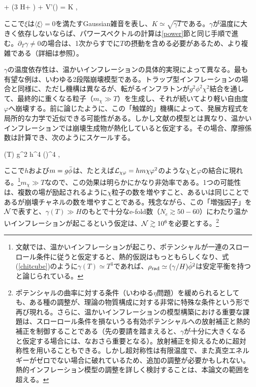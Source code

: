 \beq
\label{warmd1}
\ddot \phi + (3 H+ \gamma) \dot\phi + V'(\phi) = K \xi,
\eeq

ここで$\xi$は$\langle\xi\rangle=0$を満たすGaussian雑音を表し、$K\simeq\sqrt{\gamma T}$である。$\gamma$が温度に大きく依存しないならば、パワースペクトルの計算は\ref{power}節と同じ手順で進む。$\partial_T\gamma\neq0$の場合は、1次からすでに$T$の摂動を含める必要があるため、より複雑である（詳細は\cite{warmf33,berera11}参照）。

$\gamma$の温度依存性は、温かいインフレーションの具体的実現によって異なる。最も有望な例は、いわゆる2段階崩壊模型である\cite{warm}。トラップ型インフレーションの場合と同様に、ただし機構は異なるが、転がるインフラトンが$g^2\phi^2\chi^2$結合を通して、最終的に重くなる粒子（$m_\chi\gg T$）を生成し、それが続いてより軽い自由度$\varphi$へ崩壊する。前に論じたように、この「触媒的」機構によって、発展方程式を局所的な力学で近似できる可能性がある。しかし文献\cite{trapped}の模型とは異なり、温かいインフレーションでは崩壊生成物が熱化していると仮定する。その場合、摩擦係数は計算でき、次のようにスケールする\cite{warm}。

\beq
\label{chitcube}
\gamma(T) \simeq g^2 h^4 \left(\right)^4 ,
\eeq

ここで$h$および$m=g{\bar\phi}$は、たとえば${\cal L}_{\chi\varphi}=hm\chi\varphi^2$のような$\chi$と$\varphi$の結合に現れる。\footnote{文献\cite{reheating}では、温かいインフレーションが起こり、ポテンシャルが一連のスローロール条件\cite{warm}に従うと仮定すると、熱的仮説はもっともらしくなり、式(\ref{chitcube})のように$\gamma(T)\simeq T^3$であれば、$\rho_{\rm rad}\simeq(\gamma/H)\dot\phi^2$は安定平衡を持つと論じられている。}$m_\chi\gg T$なので、この効果は明らかにかなり非効率である。1つの可能性は、複数の場が励起されるように$\chi$粒子の数を増やすこと、あるいは同じことであるが崩壊チャネルの数を増やすことである。残念ながら、この「増強因子」を$\cal N$で表すと、$\gamma(T)\gg H$のもとで十分なe-fold数（$N_e\gtrsim50-60$）にわたり温かいインフレーションが起こるという仮定は、${\cal N}\gtrsim10^6$を必要とする\cite{bastero,bueno}。\footnote{ポテンシャルの曲率に対する条件（いわゆる$\eta$問題）を緩められるとしても、ある種の調整が、理論の物質構成に対する非常に特殊な条件という形で再び現れる。さらに、温かいインフレーションの模型構築における重要な課題は、スローロール条件を損ないうる有効ポテンシャルへの放射補正と熱的補正を制御することである（先の要請を踏まえると、$\gamma$が十分に大きくなると仮定する場合\cite{linde}には、なおさら重要となる）。放射補正を抑えるために超対称性を用いることもできる\cite{hall}。しかし超対称性は有限温度で、また真空エネルギーがゼロでない場合に破れているため、追加の調整が必要かもしれない。熱的インフレーション模型の調整を詳しく検討することは、本論文の範囲を超える。}

